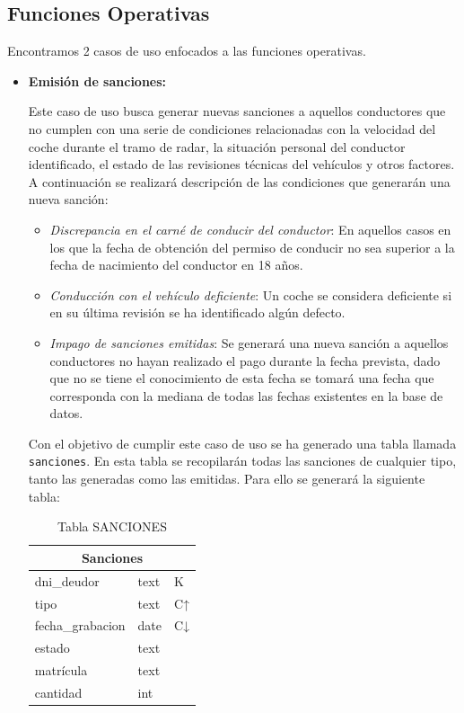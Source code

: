 \documentclass[]{article}
\begin{document}
\subsection{Funciones Operativas}
\label{subsec:funciones_operativas}

Encontramos 2 casos de uso enfocados a las funciones operativas.
\begin{itemize}
    \item \textbf{Emisión de sanciones:}
    
    Este caso de uso busca generar nuevas sanciones a aquellos conductores que no cumplen con una serie de condiciones relacionadas con la velocidad del coche durante el tramo de radar, la situación personal del conductor identificado, el estado de las revisiones técnicas del vehículos y otros factores.
    A continuación se realizará descripción de las condiciones que generarán una nueva sanción:
    \begin{itemize}
        \item \textit{Discrepancia en el carné de conducir del conductor}: En aquellos casos en los que la fecha de obtención del permiso de conducir no sea superior a la fecha de nacimiento del conductor en 18 años.
        \item \textit{Conducción con el vehículo deficiente}: Un coche se considera deficiente si en su última revisión se ha identificado algún defecto. 
        \item \textit{Impago de sanciones emitidas}: Se generará una nueva sanción a aquellos conductores no hayan realizado el pago durante la fecha prevista, dado que no se tiene el conocimiento de esta fecha se tomará una fecha que corresponda con la mediana de todas las fechas existentes en la base de datos.
    \end{itemize}

    Con el objetivo de cumplir este caso de uso se ha generado una tabla llamada \texttt{sanciones}. En esta tabla se recopilarán todas las sanciones de cualquier tipo, tanto las generadas como las emitidas. Para ello se generará la siguiente tabla:
\begin{table}[H]
    \centering
    \begin{tabular}{lll} 
        \toprule
        \multicolumn{3}{c}{\large\textbf{Sanciones}} \\ 
        \midrule
        dni\_deudor    & text & K \\
        tipo           & text & C↑\\
        fecha\_grabacion & date & C↓\\
        estado & text &\\
        matrícula & text &\\
        cantidad & int &\\
        \bottomrule
    \end{tabular}
    \caption {Tabla SANCIONES}
 \end{table}


\end{itemize}
\end{document}
